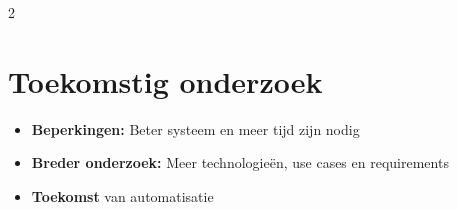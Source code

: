 \documentclass[a0,portrait]{hogent-poster}
\begin{document}
\begin{multicols}{2}
\section{Toekomstig onderzoek}
\bigskip
\begin{itemize}
    \setlength\itemsep{0.5em}
    \item \textbf{Beperkingen:} Beter systeem en meer tijd zijn nodig
    \item \textbf{Breder onderzoek:} Meer technologieën, use cases en requirements
    \item \textbf{Toekomst} van automatisatie
\end{itemize}


\end{multicols}
\end{document}
